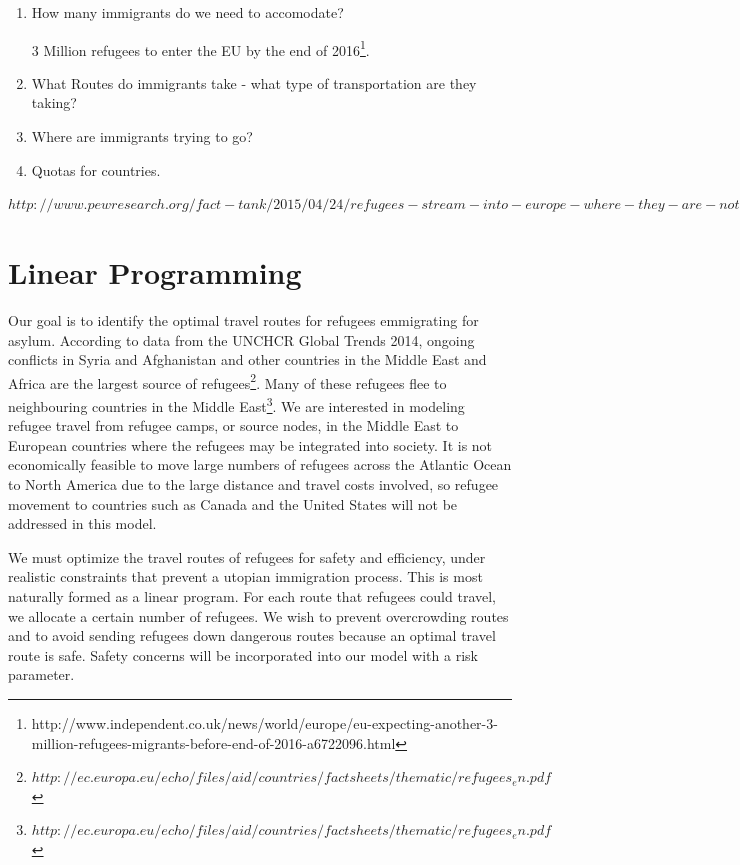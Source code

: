 \documentclass{article}
\begin{document}
\begin{enumerate}
    \item How many immigrants do we need to accomodate?

    3 Million refugees to enter the EU by the end of 2016\footnote{http://www.independent.co.uk/news/world/europe/eu-expecting-another-3-million-refugees-migrants-before-end-of-2016-a6722096.html}.

    \item What Routes do immigrants take - what type of transportation are they taking?

    \item Where are immigrants trying to go?

    \item Quotas for countries.
\end{enumerate}

$http://www.pewresearch.org/fact-tank/2015/04/24/refugees-stream-into-europe-where-they-are-not-welcomed-with-open-arms/ft_15-04-22_eu-immigration/$


\section{Linear Programming}

Our goal is to identify the optimal travel routes for refugees emmigrating for asylum. According to data from the UNCHCR Global Trends 2014, ongoing conflicts in Syria and Afghanistan and other countries in the Middle East and Africa are the largest source of refugees\footnote{$http://ec.europa.eu/echo/files/aid/countries/factsheets/thematic/refugees_en.pdf$}. Many of these refugees flee to neighbouring countries in the Middle East\footnote{$http://ec.europa.eu/echo/files/aid/countries/factsheets/thematic/refugees_en.pdf$}. We are interested in modeling refugee travel from refugee camps, or source nodes, in the Middle East to European countries where the refugees may be integrated into society. It is not economically feasible to move large numbers of refugees across the Atlantic Ocean to North America due to the large distance and travel costs involved, so refugee movement to countries such as Canada and the United States will not be addressed in this model. 

We must optimize the travel routes of refugees for safety and efficiency, under realistic constraints that prevent a utopian immigration process. This is most naturally formed as a linear program. For each route that refugees could travel, we allocate a certain number of refugees. We wish to prevent overcrowding routes and to avoid sending refugees down dangerous routes because an optimal travel route is safe. Safety concerns will be incorporated into our model with a risk parameter. 
\end{document}
